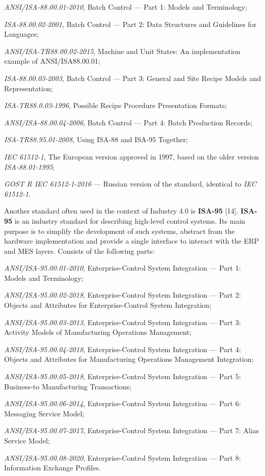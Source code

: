\documentclass[10pt, a4paper]{proc}
\begin{document}
{\begin{itemize}[noitemsep]
\normalsize{
\item \textit{ANSI/ISA-88.00.01-2010}, Batch Control — Part 1:
Models and Terminology;
\item \textit{ISA-88.00.02-2001}, Batch Control — Part 2: Data
Structures and Guidelines for Languages;
\item \textit{ANSI/ISA-TR88.00.02-2015}, Machine and Unit
States: An implementation example of ANSI/ISA88.00.01;
\item \textit{ISA-88.00.03-2003}, Batch Control — Part 3: General and Site Recipe Models and Representation;
\item \textit{ISA-TR88.0.03-1996}, Possible Recipe Procedure
Presentation Formats;
\item \textit{ANSI/ISA-88.00.04-2006}, Batch Control — Part 4:
Batch Production Records;
\item \textit{ISA-TR88.95.01-2008}, Using ISA-88 and ISA-95
Together;
\item \textit{IEC 61512-1}, The European version approved in
1997, based on the older version \textit{ISA-88.01-1995};
\item \textit{GOST R IEC 61512-1-2016} — Russian version of
the standard, identical to \textit{IEC 61512-1}.}
\end{itemize}

 Another standard often used in the context of Industry
4.0 is \textbf{ISA-95} [14]. \textbf{ISA-95} is an industry standard for
describing high-level control systems. Its main purpose
is to simplify the development of such systems, abstract
from the hardware implementation and provide a single
interface to interact with the ERP and MES layers.
Consists of the following parts:

\begin{itemize}[noitemsep]
\normalsize{
\item \textit{ANSI/ISA-95.00.01-2010}, Enterprise-Control System Integration — Part 1: Models and Terminology;
\item \textit{ANSI/ISA-95.00.02-2018}, Enterprise-Control System Integration — Part 2: Objects and Attributes
for Enterprise-Control System Integration;
\item \textit{ANSI/ISA-95.00.03-2013}, Enterprise-Control System Integration — Part 3: Activity Models of Manufacturing Operations Management;
\item \textit{ANSI/ISA-95.00.04-2018}, Enterprise-Control System Integration — Part 4: Objects and Attributes for
Manufacturing Operations Management Integration;
\item \textit{ANSI/ISA-95.00.05-2018}, Enterprise-Control System Integration — Part 5: Business-to Manufacturing Transactions;
\item \textit{ANSI/ISA-95.00.06-2014}, Enterprise-Control System Integration — Part 6: Messaging Service
Model;
\item \textit{ANSI/ISA-95.00.07-2017}, Enterprise-Control System Integration — Part 7: Alias Service Model;
\item \textit{ANSI/ISA-95.00.08-2020}, Enterprise-Control System Integration — Part 8: Information Exchange
Profiles.}
\end{itemize}

}
\end{document}
